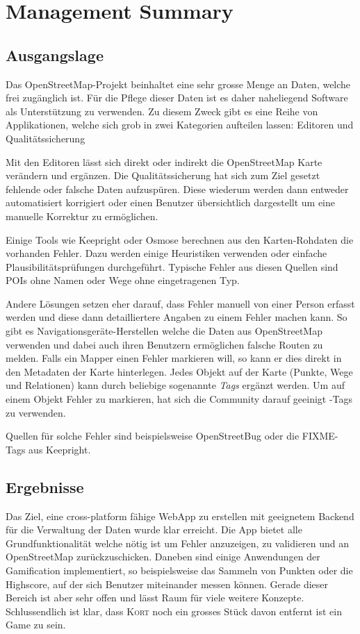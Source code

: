 \chapter*{Management Summary}
\thispagestyle{scrheadings}


\section*{Ausgangslage}
Das OpenStreetMap-Projekt beinhaltet eine sehr grosse Menge an Daten, welche frei zugänglich ist.
Für die Pflege dieser Daten ist es daher naheliegend Software als Unterstützung zu verwenden.
Zu diesem Zweck gibt es eine Reihe von Applikationen, welche sich grob in zwei Kategorien aufteilen lassen:
Editoren und Qualitätssicherung

Mit den Editoren lässt sich direkt oder indirekt die OpenStreetMap Karte verändern und ergänzen.
Die Qualitätssicherung hat sich zum Ziel gesetzt fehlende oder falsche Daten aufzuspüren.
Diese wiederum werden dann entweder automatisiert korrigiert oder einen Benutzer übersichtlich dargestellt um eine manuelle Korrektur zu ermöglichen.

Einige Tools wie Keepright oder Osmose berechnen aus den Karten-Rohdaten die vorhanden Fehler.
Dazu werden einige Heuristiken verwenden oder einfache Plausibilitätsprüfungen durchgeführt.
Typische Fehler aus diesen Quellen sind \gls{POI}s ohne Namen oder Wege ohne eingetragenen Typ.

Andere Lösungen setzen eher darauf, dass Fehler manuell von einer Person erfasst werden und diese dann detailliertere Angaben zu einem Fehler machen kann. 
So gibt es Navigationsgeräte-Herstellen welche die Daten aus OpenStreetMap verwenden und dabei auch ihren Benutzern ermöglichen falsche Routen zu melden. 
Falls ein \gls{Mapper} einen Fehler markieren will, so kann er dies direkt in den Metadaten der Karte hinterlegen. Jedes Objekt auf der Karte (Punkte, Wege und Relationen) kann durch beliebige sogenannte  \emph{Tags} ergänzt werden.
Um auf einem Objekt Fehler zu markieren, hat sich die Community darauf geeinigt -Tags zu verwenden.

Quellen für solche Fehler sind beispielsweise OpenStreetBug oder die FIXME-Tags aus Keepright.


\section*{Ergebnisse}
Das Ziel, eine cross-platform fähige \gls{WebApp} zu erstellen mit geeignetem Backend für die Verwaltung der Daten wurde klar erreicht.
Die App bietet alle Grundfunktionalität welche nötig ist um Fehler anzuzeigen, zu validieren und an OpenStreetMap zurückzuschicken.
Daneben sind einige Anwendungen der Gamification implementiert, so beispielsweise das Sammeln von Punkten oder die Highscore, auf der sich Benutzer miteinander messen können.
Gerade dieser Bereich ist aber sehr offen und lässt Raum für viele weitere Konzepte. Schlussendlich ist klar, dass \textsc{Kort} noch ein grosses Stück davon entfernt ist ein Game zu sein.


